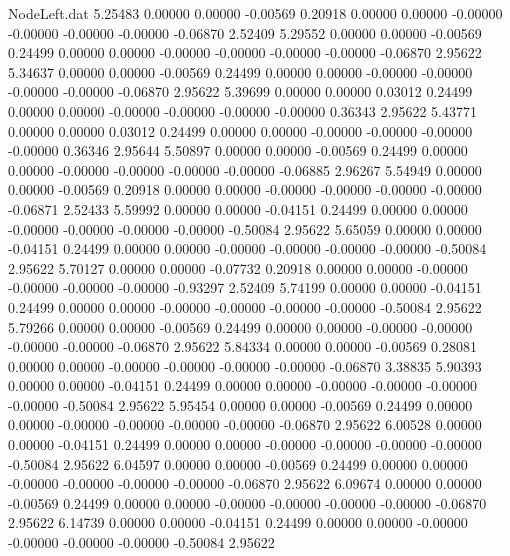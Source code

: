 \begin{filecontents}{NodeLeft.dat}
   5.25483    0.00000    0.00000    -0.00569    0.20918    0.00000    0.00000   -0.00000   -0.00000   -0.00000   -0.00000   -0.06870    2.52409
   5.29552    0.00000    0.00000    -0.00569    0.24499    0.00000    0.00000   -0.00000   -0.00000   -0.00000   -0.00000   -0.06870    2.95622
   5.34637    0.00000    0.00000    -0.00569    0.24499    0.00000    0.00000   -0.00000   -0.00000   -0.00000   -0.00000   -0.06870    2.95622
   5.39699    0.00000    0.00000     0.03012    0.24499    0.00000    0.00000   -0.00000   -0.00000   -0.00000   -0.00000    0.36343    2.95622
   5.43771    0.00000    0.00000     0.03012    0.24499    0.00000    0.00000   -0.00000   -0.00000   -0.00000   -0.00000    0.36346    2.95644
   5.50897    0.00000    0.00000    -0.00569    0.24499    0.00000    0.00000   -0.00000   -0.00000   -0.00000   -0.00000   -0.06885    2.96267
   5.54949    0.00000    0.00000    -0.00569    0.20918    0.00000    0.00000   -0.00000   -0.00000   -0.00000   -0.00000   -0.06871    2.52433
   5.59992    0.00000    0.00000    -0.04151    0.24499    0.00000    0.00000   -0.00000   -0.00000   -0.00000   -0.00000   -0.50084    2.95622
   5.65059    0.00000    0.00000    -0.04151    0.24499    0.00000    0.00000   -0.00000   -0.00000   -0.00000   -0.00000   -0.50084    2.95622
   5.70127    0.00000    0.00000    -0.07732    0.20918    0.00000    0.00000   -0.00000   -0.00000   -0.00000   -0.00000   -0.93297    2.52409
   5.74199    0.00000    0.00000    -0.04151    0.24499    0.00000    0.00000   -0.00000   -0.00000   -0.00000   -0.00000   -0.50084    2.95622
   5.79266    0.00000    0.00000    -0.00569    0.24499    0.00000    0.00000   -0.00000   -0.00000   -0.00000   -0.00000   -0.06870    2.95622
   5.84334    0.00000    0.00000    -0.00569    0.28081    0.00000    0.00000   -0.00000   -0.00000   -0.00000   -0.00000   -0.06870    3.38835
   5.90393    0.00000    0.00000    -0.04151    0.24499    0.00000    0.00000   -0.00000   -0.00000   -0.00000   -0.00000   -0.50084    2.95622
   5.95454    0.00000    0.00000    -0.00569    0.24499    0.00000    0.00000   -0.00000   -0.00000   -0.00000   -0.00000   -0.06870    2.95622
   6.00528    0.00000    0.00000    -0.04151    0.24499    0.00000    0.00000   -0.00000   -0.00000   -0.00000   -0.00000   -0.50084    2.95622
   6.04597    0.00000    0.00000    -0.00569    0.24499    0.00000    0.00000   -0.00000   -0.00000   -0.00000   -0.00000   -0.06870    2.95622
   6.09674    0.00000    0.00000    -0.00569    0.24499    0.00000    0.00000   -0.00000   -0.00000   -0.00000   -0.00000   -0.06870    2.95622
   6.14739    0.00000    0.00000    -0.04151    0.24499    0.00000    0.00000   -0.00000   -0.00000   -0.00000   -0.00000   -0.50084    2.95622

\end{filecontents}
